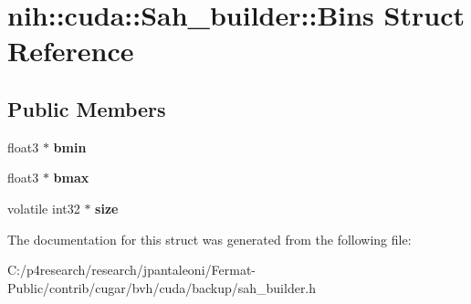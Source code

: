 \hypertarget{structnih_1_1cuda_1_1_sah__builder_1_1_bins}{}\section{nih\+:\+:cuda\+:\+:Sah\+\_\+builder\+:\+:Bins Struct Reference}
\label{structnih_1_1cuda_1_1_sah__builder_1_1_bins}
\subsection*{Public Members}
\begin{DoxyCompactItemize}
\item 
\mbox{\label{structnih_1_1cuda_1_1_sah__builder_1_1_bins_a6845d66cf1473f8ff732fb7ad1014fa3}} 
float3 $\ast$ {\bfseries bmin}
\item 
\mbox{\label{structnih_1_1cuda_1_1_sah__builder_1_1_bins_a91edfaf7b718dc0a34cb3e6a302c92e7}} 
float3 $\ast$ {\bfseries bmax}
\item 
\mbox{\label{structnih_1_1cuda_1_1_sah__builder_1_1_bins_a85acf005f8b3611c6cfdaa95162591f0}} 
volatile int32 $\ast$ {\bfseries size}
\end{DoxyCompactItemize}


The documentation for this struct was generated from the following file\+:\begin{DoxyCompactItemize}
\item 
C\+:/p4research/research/jpantaleoni/\+Fermat-\/\+Public/contrib/cugar/bvh/cuda/backup/sah\+\_\+builder.\+h\end{DoxyCompactItemize}
